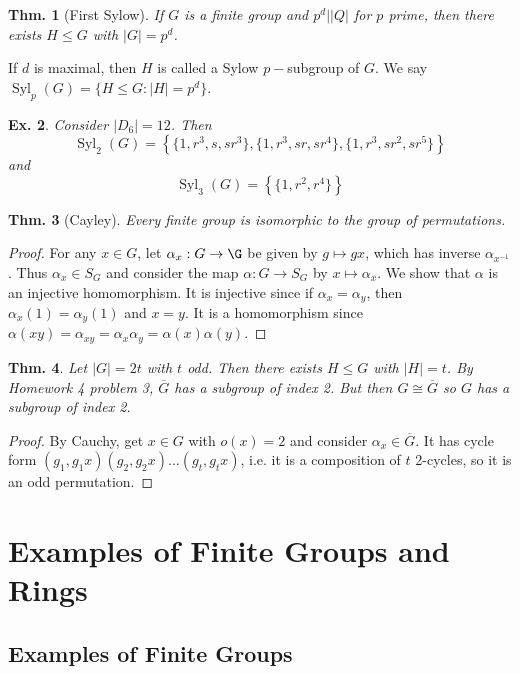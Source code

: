 \documentclass[12pt, a4paper]{book}
\newtheorem{theorem}{Thm.}[section]
\newtheorem{example}[theorem]{Ex.}
\theoremstyle{nonumberplain}
\newtheorem{proof}{Proof}
\begin{document}
\begin{theorem}[First Sylow]
    If $G$ is a finite group and $p^d||Q|$ for $p$ prime, then there exists $H\leq G$ with $|G|=p^d$.
\end{theorem}
If $d$ is maximal, then $H$ is called a Sylow $p-$subgroup of $G$.
We say $\operatorname{Syl}_p(G)=\{H\leq G:|H|=p^d\}$.
\begin{example}
    Consider $|D_6|=12$.
    Then
    \[\operatorname{Syl}_2(G)=\left\{\{1,r^3,s,sr^3\},\{1,r^3,sr,sr^4\},\{1,r^3,sr^2,sr^5\}\right\}\]
    and
    \[\operatorname{Syl}_3(G)=\left\{\{1,r^2,r^4\}\right\}\]
\end{example}
\begin{theorem}[Cayley]
    Every finite group is isomorphic to the group of permutations.
\end{theorem}
\begin{proof}
    For any $x\in G$, let $\alpha_x:G\to\G$ be given by $g\mapsto gx$, which has inverse $\alpha_{x^{-1}}$.
    Thus $\alpha_x\in S_G$ and consider the map $\alpha:G\to S_G$ by $x\mapsto\alpha_x$.
    We show that $\alpha$ is an injective homomorphism.
    It is injective since if $\alpha_x=\alpha_y$, then $\alpha_x(1)=\alpha_y(1)$ and $x=y$.
    It is a homomorphism since $\alpha(xy)=\alpha_{xy}=\alpha_x\alpha_y=\alpha(x)\alpha(y)$.
\end{proof}
\begin{theorem}
    Let $|G|=2t$ with $t$ odd.
    Then there exists $H\leq G$ with $|H|=t$.
    By Homework 4 problem 3, $\overline{G}$ has a subgroup of index 2.
    But then $G\cong\overline{G}$ so $G$ has a subgroup of index 2.
\end{theorem}
\begin{proof}
    By Cauchy, get $x\in G$ with $o(x)=2$ and consider $\alpha_x\in\overline{G}$.
    It has cycle form $(g_1,g_1x)(g_2,g_2x)\ldots(g_t,g_tx)$, i.e. it is a composition of $t$ 2-cycles, so it is an odd permutation.
\end{proof}
\chapter{Examples of Finite Groups and Rings}
\section{Examples of Finite Groups}
\end{document}

